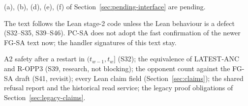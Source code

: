\documentclass{article}
\begin{document}
\begin{description}
  (a), (b), (d), (e), (f) of Section~\ref{sec:pending-interface} are
  pending.
\item[R-spec-b] The text follows the Lean stage-2 code unless the Lean
  behaviour is a defect (S32--S35, S39--S46).  PC-SA does not adopt the
  fast confirmation of the newer FG-SA text now; the handler signatures of
  this text stay.
\item[Open] A2 safety after a restart in $(t_{w-1},t_w]$ (S32); the
  equivalence of LATEST-ANC and R-OPP3 (S39, research, not blocking); the
  opponent count against the FG-SA draft (S41, revisit); every Lean claim
  field
  (Section~\ref{sec:claims}); the shared refusal report and the
  historical read service; the legacy proof obligations of
  Section~\ref{sec:legacy-claims}.
\end{description}
\end{document}
